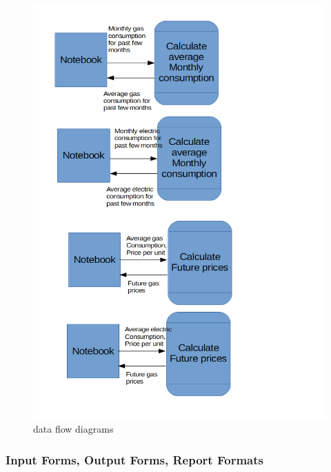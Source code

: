 \begin{figure}[H]
    \includegraphics[width=\textwidth]{./dataflowdiagrams2.png}
    \caption{data flow diagrams} \label{fig:dataflowdiagrams}
\end{figure}

\subsubsection{Input Forms, Output Forms, Report Formats}

